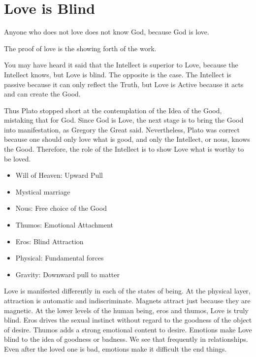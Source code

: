 \section{Love is Blind}

\begin{quotex}
Anyone who does not love does not know God, because God is love.

The proof of love is the showing forth of the work.
\end{quotex}


You may have heard it said that the Intellect is superior to Love, because the Intellect knows, but Love is blind. The opposite is the case. The Intellect is passive because it can only reflect the Truth, but Love is Active because it acts and can create the Good.

Thus Plato stopped short at the contemplation of the Idea of the Good, mistaking that for God. Since God is Love, the next stage is to bring the Good into manifestation, as Gregory the Great said. Nevertheless, Plato was correct because one should only love what is good, and only the Intellect, or nous, knows the Good. Therefore, the role of the Intellect is to show Love what is worthy to be loved.

\begin{itemize}


\item Will of Heaven: Upward Pull

\item Mystical marriage

\item Nous: Free choice of the Good

\item Thumos: Emotional Attachment

\item Eros: Blind Attraction

\item Physical: Fundamental forces

\item Gravity: Downward pull to matter
\end{itemize}


Love is manifested differently in each of the states of being. At the physical layer, attraction is automatic and indiscriminate. Magnets attract just because they are magnetic. At the lower levels of the human being, eros and thumos, Love is truly blind. Eros drives the sexual instinct without regard to the goodness of the object of desire. Thumos adds a strong emotional content to desire. Emotions make Love blind to the idea of goodness or badness. We see that frequently in relationships. Even after the loved one is bad, emotions make it difficult the end things.


